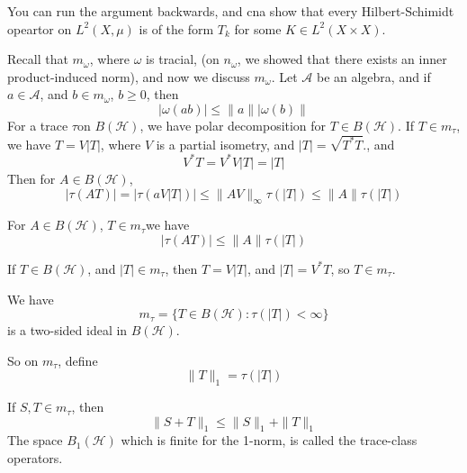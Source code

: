 \begin{note}
    You can run the argument backwards, and cna show that every Hilbert-Schimidt opeartor on $L^2(X,\mu)$ is of the form $T_k$ for some $K\in L^2(X\times X)$.
\end{note}
Recall that $m_\omega$, where $\omega$ is tracial, (on $n_\omega$, we showed that there exists an inner product-induced norm), and now we discuss $m_\omega$. Let $\mathcal{A}$ be an algebra, and if $a\in\mathcal{A}$, and $b\in m_\omega$, $b\geq0$, then 
\begin{equation*}
    |\omega(ab)|\leq\|a\||\omega(b)\|
\end{equation*}
For a trace $\tau$on $B(\mathcal{H})$, we have polar decomposition for $T\in B(\mathcal{H})$. If $T\in m_\tau$, we have $T=V|T|$, where $V$ is a partial isometry, and $|T|=\sqrt{T^*T}$., and 
\begin{equation*}
    V^*T=V^*V|T|=|T|
\end{equation*}
Then for $A\in B(\mathcal{H})$, 
\begin{equation*}
    |\tau(AT)|=|\tau(aV|T|)|\leq \|AV\|_\infty\tau(|T|)\leq\|A\|\tau(|T|)
\end{equation*}
\begin{proposition}
    For $A\in B(\mathcal{H})$, $T\in m_\tau$we have 
    \begin{equation*}
        |\tau(AT)|\leq\|A\|\tau(|T|)
    \end{equation*}
\end{proposition}
If $T\in B(\mathcal{H})$, and $|T|\in m_\tau$, then $T=V|T|$, and $|T|=V^*T$, so $T\in m_\tau$. 
\begin{proposition}
    We have 
    \begin{equation*}
        m_\tau=\{T\in B(\mathcal{H}): \tau(|T|)<\infty\}
    \end{equation*}
    is a two-sided ideal in $B(\mathcal{H})$.
\end{proposition}
So on $m_\tau$, define 
\begin{equation*}
    \|T\|_1=\tau(|T|)
\end{equation*}
\begin{proposition}
    If $S,T\in m_\tau$, then 
    \begin{equation*}
        \|S+T\|_1\leq\|S\|_1+\|T\|_1
    \end{equation*}
    The space $B_1(\mathcal{H})$ which is finite for the 1-norm, is called the trace-class operators.
\end{proposition}
